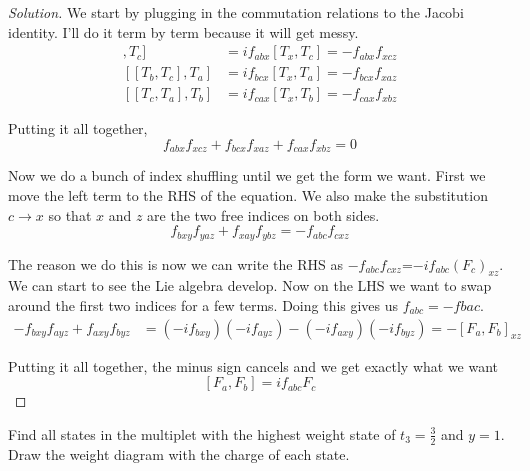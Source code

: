 \documentclass[12pt]{article}
\newenvironment{questionpart}[2][Part]{\begin{trivlist}
\item[\hskip \labelsep \hskip \labelsep {\bfseries (#2)}]}{\end{trivlist}}
\newenvironment{solution}{\begin{proof}[Solution]}{\end{proof}}
\begin{document}
\begin{solution}

We start by plugging in the commutation relations to the Jacobi identity. I'll do it term by term because it will get messy.
\begin{align*}
    [[T_a,T_b],T_c]&=if_{abx}[T_x,T_c]=-f_{abx}f_{xcz} \\
    [[T_b,T_c],T_a]&=if_{bcx}[T_x,T_a]=-f_{bcx}f_{xaz} \\
    [[T_c,T_a],T_b]&=if_{cax}[T_x,T_b]=-f_{cax}f_{xbz}
\end{align*}

Putting it all together,
\begin{equation*}
    f_{abx}f_{xcz}+f_{bcx}f_{xaz}+f_{cax}f_{xbz}=0
\end{equation*}

Now we do a bunch of index shuffling until we get the form we want. First we move the left term to the RHS of the equation. We also make the substitution $c\rightarrow x$ so that $x$ and $z$ are the two free indices on both sides.
\begin{equation*}
    f_{bxy}f_{yaz}+f_{xay}f_{ybz}=-f_{abc}f_{cxz}
\end{equation*}

The reason we do this is now we can write the RHS as $-f_{abc}f_{cxz}$=$-if_{abc}(F_c)_{xz}$. We can start to see the Lie algebra develop. Now on the LHS we want to swap around the first two indices for a few terms. Doing this gives us $f_{abc}=-f{bac}$.
\begin{align*}
    -f_{bxy}f_{ayz}+f_{axy}f_{byz}&=(-if_{bxy})(-if_{ayz})-(-if_{axy})(-if_{byz}) =-[F_a,F_b]_{xz}
\end{align*}

Putting it all together, the minus sign cancels and we get exactly what we want
\begin{equation*}
    \boxed{[F_a,F_b]=if_{abc}F_c}
\end{equation*}
\end{solution}

\begin{questionpart}{c}
Find all states in the multiplet with the highest weight state of $t_3=\frac{3}{2}$ and $y=1$. Draw the weight diagram with the charge of each state.
\end{questionpart}
\end{document}
